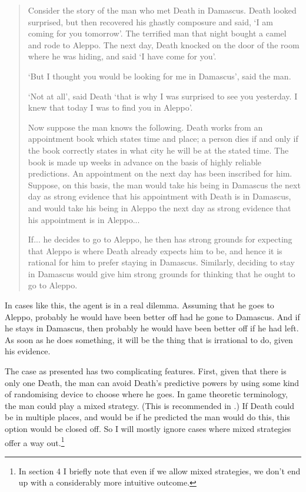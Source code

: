 \begin{quote}
Consider the story of the man who met Death in Damascus. Death looked surprised, but then recovered his ghastly composure and said, 
`I {\sc am coming for you tomorrow}'. The terrified man that night bought a camel and rode to Aleppo. The next day, Death knocked on the door of the room where he was hiding, and said `I {\sc have come for you}'. 

`But I thought you would be looking for me in Damascus', said the man.
 
`{\sc Not at all}', said Death `{\sc that is why I was surprised to see you yesterday. I knew that today I was to find you in Aleppo}'. 

Now suppose the man knows the following. Death works from an appointment book which states time and place; a person dies if and only if the book correctly states in what city he will be at the stated time. The book is made up weeks in advance on the basis of highly reliable predictions. An appointment on the next day has been inscribed for him. Suppose, on this basis, the man would take his being in Damascus the next day as strong evidence that his appointment with Death is in Damascus, and would take his being in Aleppo the next day as strong evidence that his appointment is in Aleppo...
 
If... he decides to go to Aleppo, he then has strong grounds for expecting that Aleppo is where Death already expects him to be, and hence it is rational for him to prefer staying in Damascus. Similarly, deciding to stay in Damascus would give him strong grounds for thinking that he ought to go to Aleppo.
\end{quote}

\noindent In cases like this, the agent is in a real dilemma. Assuming that he goes to Aleppo, probably he would have been better off had he gone to Damascus. And if he stays in Damascus, then probably he would have been better off if he had left. As soon as he does something, it will be the thing that is irrational to do, given his evidence.

The case as presented has two complicating features. First, given that there is only one Death, the man can avoid Death's predictive powers by using some kind of randomising device to choose where he goes. In game theoretic terminology, the man could play a mixed strategy. (This is recommended in \citet{Weirich2008}.) If Death could be in multiple places, and would be if he predicted the man would do this, this option would be closed off. So I will mostly ignore cases where mixed strategies offer a way out.\footnote{In section 4 I briefly note that even if we allow mixed strategies, we don't end up with a considerably more intuitive outcome.}

